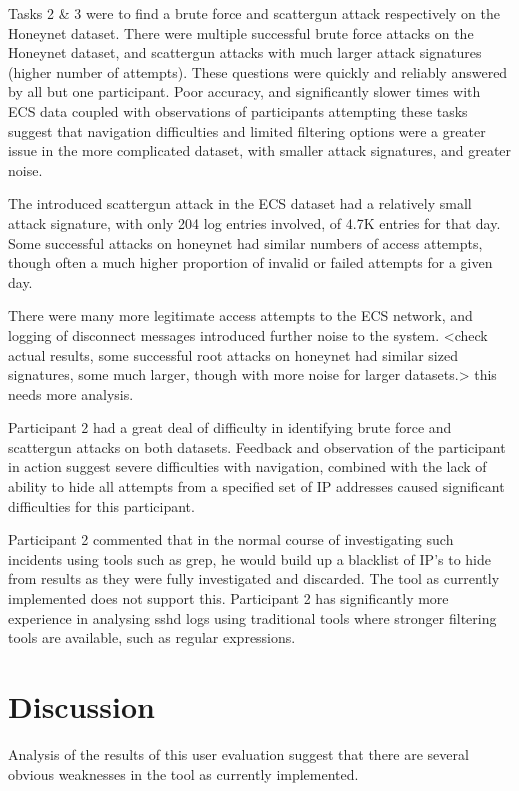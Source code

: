 Tasks 2 \& 3 were to find a brute force and scattergun attack respectively on the Honeynet dataset.
There were multiple successful brute force attacks on the Honeynet dataset, and scattergun attacks with much larger attack signatures (higher number of attempts). These questions were quickly and reliably answered by all but one participant. Poor accuracy, and significantly slower times with ECS data coupled with observations of participants attempting these tasks suggest that navigation difficulties and limited filtering options were a greater issue in the more complicated dataset, with smaller attack signatures, and greater noise. 

The introduced scattergun attack in the ECS dataset had a relatively small attack signature, with only 204 log entries involved, of 4.7K entries for that day. Some successful attacks on honeynet had similar numbers of access attempts, though often a much higher proportion of invalid or failed attempts for a given day. 

There were many more legitimate access attempts to the ECS network, and logging of disconnect messages introduced further noise to the system. 
<check actual results, some successful root attacks on honeynet had similar sized signatures, some much larger, though with more noise for larger datasets.>
this needs more analysis.

Participant 2 had a great deal of difficulty in identifying brute force and scattergun attacks on both datasets. Feedback and observation of the participant in action suggest severe difficulties with navigation, combined with the lack of ability to hide all attempts from a specified set of IP addresses caused significant difficulties for this participant.

Participant 2 commented that in the normal course of investigating such incidents using tools such as grep, he would build up a blacklist of IP's to hide from results as they were fully investigated and discarded.
The tool as currently implemented does not support this. Participant 2 has significantly more experience in analysing sshd logs using traditional tools where stronger filtering tools are available, such as regular expressions. 

\section{Discussion} 

Analysis of the results of this user evaluation suggest that there are several obvious weaknesses in the tool as currently implemented. 

